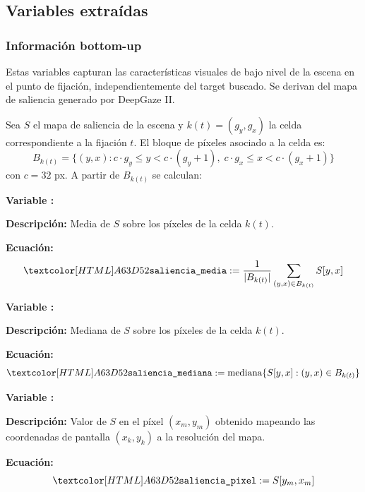 \subsection{Variables extraídas}

\subsubsection{Información bottom-up}

Estas variables capturan las características visuales de bajo nivel
de la escena en el punto de fijación, independientemente del target
buscado. Se derivan del mapa de saliencia generado por DeepGaze II.

Sea $S$ el mapa de saliencia de la escena y $k(t) = (g_y, g_x)$
la celda correspondiente a la fijación $t$. El bloque de píxeles
asociado a la celda es:
\begin{equation}
    B_{k(t)} = \{(y, x) : c \cdot g_y \leq y < c \cdot (g_y + 1),\;
    c \cdot g_x \leq x < c \cdot (g_x + 1)\}
\end{equation}
con $c = 32$ px. A partir de $B_{k(t)}$ se calculan:

\begin{featuredef}
\textbf{Variable \thetcbcounter:} 

\textbf{Descripción:} Media de $S$ sobre los píxeles de la celda $k(t)$.

\textbf{Ecuación:}
\begin{equation}
    \feat{saliencia\_media} := \frac{1}{|B_{k(t)}|}
    \sum_{(y,x) \in B_{k(t)}} S[y, x]
\end{equation}
\end{featuredef}

\begin{featuredef}
\textbf{Variable \thetcbcounter:} 

\textbf{Descripción:} Mediana de $S$ sobre los píxeles de la celda $k(t)$.

\textbf{Ecuación:}
\begin{equation}
    \feat{saliencia\_mediana} := \text{mediana}\{S[y, x] : (y, x) \in B_{k(t)}\}
\end{equation}
\end{featuredef}

\begin{featuredef}
\textbf{Variable \thetcbcounter:} 

\textbf{Descripción:} Valor de $S$ en el píxel $(x_m, y_m)$ obtenido
mapeando las coordenadas de pantalla $(x_k, y_k)$ a la resolución del mapa.

\textbf{Ecuación:}
\begin{equation}
    \feat{saliencia\_pixel} := S[y_m, x_m]
\end{equation}
\end{featuredef}

